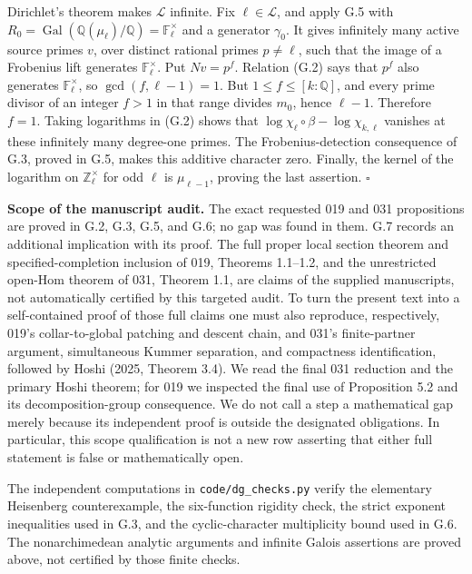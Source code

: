 \documentclass[10pt,a4paper]{article}
\begin{document}
Dirichlet's theorem makes \(\mathcal L\) infinite. Fix \(\ell\in\mathcal L\), and apply G.5 with \(R_0=\operatorname{Gal}(\mathbb Q(\mu_\ell)/\mathbb Q)=\mathbb F_\ell^{\times}\) and a generator \(\gamma_0\). It gives infinitely many active source primes \(v\), over distinct rational primes \(p\ne\ell\), such that the image of a Frobenius lift generates \(\mathbb F_\ell^{\times}\). Put \(Nv=p^f\). Relation (G.2) says that \(p^f\) also generates \(\mathbb F_\ell^{\times}\), so \(\gcd(f,\ell-1)=1\). But \(1\leq f\leq[k:\mathbb Q]\), and every prime divisor of an integer \(f>1\) in that range divides \(m_0\), hence \(\ell-1\). Therefore \(f=1\). Taking logarithms in (G.2) shows that \(\log\chi_\ell\circ\beta-\log\chi_{k,\ell}\) vanishes at these infinitely many degree-one primes. The Frobenius-detection consequence of G.3, proved in G.5, makes this additive character zero. Finally, the kernel of the logarithm on \(\mathbb Z_\ell^{\times}\) for odd \(\ell\) is \(\mu_{\ell-1}\), proving the last assertion. \(\square\)

\textbf{Scope of the manuscript audit.} The exact requested 019 and 031 propositions are proved in G.2, G.3, G.5, and G.6; no gap was found in them. G.7 records an additional implication with its proof. The full proper local section theorem and specified-completion inclusion of 019, Theorems 1.1--1.2, and the unrestricted open-Hom theorem of 031, Theorem 1.1, are claims of the supplied manuscripts, not automatically certified by this targeted audit. To turn the present text into a self-contained proof of those full claims one must also reproduce, respectively, 019's collar-to-global patching and descent chain, and 031's finite-partner argument, simultaneous Kummer separation, and compactness identification, followed by Hoshi (2025, Theorem 3.4). We read the final 031 reduction and the primary Hoshi theorem; for 019 we inspected the final use of Proposition 5.2 and its decomposition-group consequence. We do not call a step a mathematical gap merely because its independent proof is outside the designated obligations. In particular, this scope qualification is not a new row asserting that either full statement is false or mathematically open.

The independent computations in \texttt{code/dg\_checks.py} verify the elementary Heisenberg counterexample, the six-function rigidity check, the strict exponent inequalities used in G.3, and the cyclic-character multiplicity bound used in G.6. The nonarchimedean analytic arguments and infinite Galois assertions are proved above, not certified by those finite checks.
\end{document}
